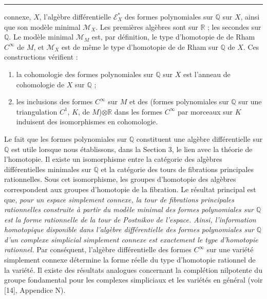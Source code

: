 \documentclass[
  french,
  a3paper,
  a3paper]{extarticle}
\begin{document}

\par

\vspace{0.7mm}\hrule\vspace{1.6mm}

\fontsize{9}{11}\selectfont

connexe, \(X\), l'algèbre différentielle \(\mathscr E_X^*\) des formes
polynomiales sur \(\mathbb Q\) sur \(X\), ainsi que son modèle minimal
\(\mathcal M_X\). Les premières algèbres sont sur \(\mathbb R\) ; les
secondes sur \(\mathbb Q\). Le modèle minimal \(\mathcal M_M\) est, par
définition, le type d'homotopie de de Rham \(C^\infty\) de \(M\), et
\(\mathcal M_X\) est de même le type d'homotopie de de Rham sur
\(\mathbb Q\) de \(X\). Ces constructions vérifient :

\begin{enumerate}
\def\labelenumi{\alph{enumi})}
\item
  la cohomologie des formes polynomiales sur \(\mathbb Q\) sur \(X\) est
  l'anneau de cohomologie de \(X\) sur \(\mathbb Q\) ;
\item
  les inclusions des formes \(C^\infty\) sur \(M\) et des (formes
  polynomiales sur \(\mathbb Q\) sur une triangulation \(C^1\), \(K\),
  de \(M\))\(\otimes\mathbb R\) dans les formes \(C^\infty\) par
  morceaux sur \(K\) induisent des isomorphismes en cohomologie.
\end{enumerate}

Le fait que les formes polynomiales sur \(\mathbb Q\) constituent une
algèbre différentielle sur \(\mathbb Q\) est utile lorsque nous
établissons, dans la Section 3, le lien avec la théorie de l'homotopie.
Il existe un isomorphisme entre la catégorie des algèbres
différentielles minimales sur \(\mathbb Q\) et la catégorie des tours de
fibrations principales rationnelles. Sous cet isomorphisme, les groupes
d'homotopie des algèbres correspondent aux groupes d'homotopie de la
fibration. Le résultat principal est que, \emph{pour un espace
simplement connexe, la tour de fibrations principales rationnelles
construite à partir du modèle minimal des formes polynomiales sur
\(\mathbb Q\) est la forme rationnelle de la tour de Postnikov de
l'espace. Ainsi, l'information homotopique disponible dans l'algèbre
différentielle des formes polynomiales sur \(\mathbb Q\) d'un complexe
simplicial simplement connexe est exactement le type d'homotopie
rationnel.} Par conséquent, l'algèbre différentielle des formes
\(C^\infty\) sur une variété simplement connexe détermine la forme
réelle du type d'homotopie rationnel de la variété. Il existe des
résultats analogues concernant la complétion nilpotente du groupe
fondamental pour les complexes simpliciaux et les variétés en général
(voir {[}14{]}, Appendice N).
\end{document}
